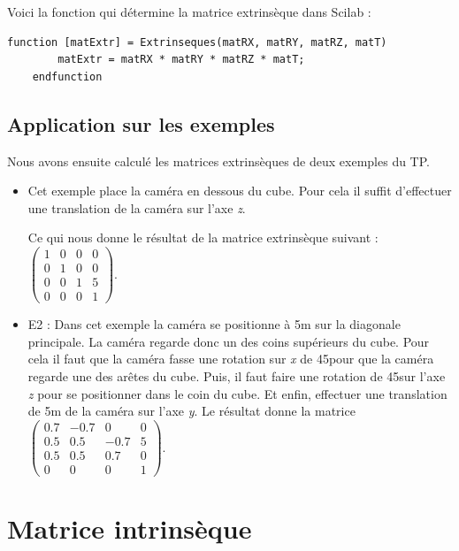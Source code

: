 \documentclass[a4paper,11pt]{article}
\begin{document}
  Voici la fonction qui détermine la matrice extrinsèque dans Scilab :
  \begin{lstlisting}[caption=Fonction qui calcule la matrice extrinsèque]
    function [matExtr] = Extrinseques(matRX, matRY, matRZ, matT)
        matExtr = matRX * matRY * matRZ * matT;
    endfunction
  \end{lstlisting}
  
  \subsection*{Application sur les exemples}
  Nous avons ensuite calculé les matrices extrinsèques de deux exemples du TP.\\
  
  \begin{itemize}
   \item Cet exemple place la caméra en dessous du cube. Pour cela il suffit
    d'effectuer une translation de la caméra sur l'axe \textit{z}.

    Ce qui nous donne le résultat de la matrice extrinsèque suivant :
    $\begin{pmatrix}
      1 & 0 & 0 & 0\\
      0 & 1 & 0 & 0\\
      0 & 0 & 1 & 5\\
      0 & 0 & 0 & 1
      \end{pmatrix}$.
   \item E2 : Dans cet exemple la caméra se positionne à 5m sur la diagonale principale.
   La caméra regarde donc un des coins supérieurs du cube. Pour cela il faut que la caméra 
   fasse une rotation sur \textit{x} de 45\degre pour que la caméra regarde une des arêtes du cube. Puis,
   il faut faire une rotation de 45\degre sur l'axe \textit{z} pour se positionner dans le coin du cube. 
   Et enfin, effectuer une translation de 5m de la caméra sur l'axe \textit{y}. Le résultat donne la matrice
   $\begin{pmatrix}
      0.7 & -0.7 & 0 & 0\\
      0.5 & 0.5 & -0.7 & 5\\
      0.5 & 0.5 & 0.7 & 0\\
      0 & 0 & 0 & 1
      \end{pmatrix}$.
  \end{itemize}
  
  \section{Matrice intrinsèque}
  
\end{document}
